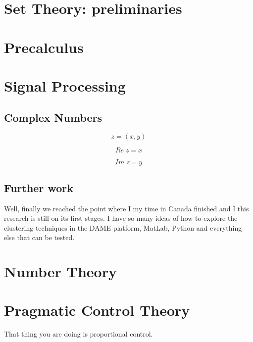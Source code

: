 \documentclass[11pt,fleqn]{book} %
\begin{document}



\chapter{Set Theory: preliminaries}


\chapter{Precalculus}



\chapter{Signal Processing}


\section{Complex Numbers}

\begin{equation}
z = (x, y)
\label{eq:c1}
\end{equation}


\begin{equation}
Re \; z = x
\label{eq:c1}
\end{equation}


\begin{equation}
Im \; z = y
\label{eq:c1}
\end{equation}

\section{Further work}
Well, finally we reached the point where I my time in Canada finished and I this research is still on its first stages. I have so many ideas of how to explore the clustering techniques in the DAME platform, MatLab, Python and everything else that can be tested. 


\chapter{Number Theory}

\chapter{Pragmatic Control Theory}

That thing you are doing is proportional control.
\end{document}
